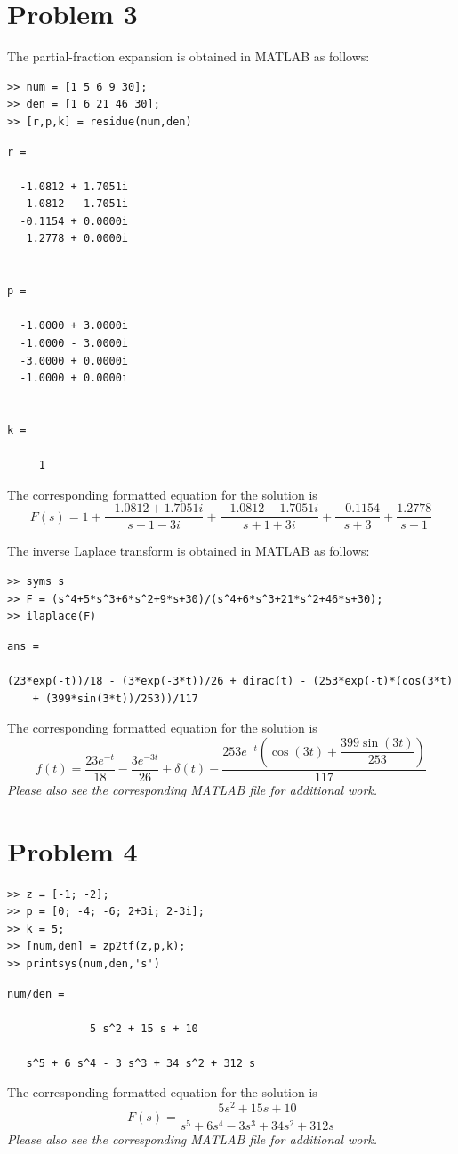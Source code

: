 \documentclass[letterpaper,10pt]{article}
\begin{document}
\section*{Problem 3}
The partial-fraction expansion is obtained in MATLAB as follows:
\begin{verbatim}
>> num = [1 5 6 9 30];
>> den = [1 6 21 46 30];
>> [r,p,k] = residue(num,den)
\end{verbatim}
\color{lightgray} \begin{verbatim}
r =

  -1.0812 + 1.7051i
  -1.0812 - 1.7051i
  -0.1154 + 0.0000i
   1.2778 + 0.0000i


p =

  -1.0000 + 3.0000i
  -1.0000 - 3.0000i
  -3.0000 + 0.0000i
  -1.0000 + 0.0000i


k =

     1
\end{verbatim} \color{black}
The corresponding formatted equation for the solution is
\begin{equation}
	F(s) = 1 + \frac{-1.0812+1.7051i}{s+1-3i} + \frac{-1.0812-1.7051i}{s+1+3i} + \frac{-0.1154}{s+3} + \frac{1.2778}{s+1}
\end{equation}

The inverse Laplace transform is obtained in MATLAB as follows:
\begin{verbatim}
>> syms s
>> F = (s^4+5*s^3+6*s^2+9*s+30)/(s^4+6*s^3+21*s^2+46*s+30);
>> ilaplace(F)
\end{verbatim}
\color{lightgray} \begin{verbatim}
ans =
 
(23*exp(-t))/18 - (3*exp(-3*t))/26 + dirac(t) - (253*exp(-t)*(cos(3*t) 
	+ (399*sin(3*t))/253))/117
\end{verbatim} \color{black}
The corresponding formatted equation for the solution is
\begin{equation}
	f(t) = \frac{23e^{-t}}{18} 
	- \frac{3e^{-3t}}{26} 
	+ \delta(t) 
	- \dfrac{253e^{-t}\left(\cos(3t) + \dfrac{399\sin(3t)}{253}\right)}{117}
\end{equation}
\emph{Please also see the corresponding MATLAB file for additional work.}

\section*{Problem 4}
\begin{verbatim}
>> z = [-1; -2];
>> p = [0; -4; -6; 2+3i; 2-3i];
>> k = 5;
>> [num,den] = zp2tf(z,p,k);
>> printsys(num,den,'s')
\end{verbatim}
\color{lightgray} \begin{verbatim} 
num/den = 
 
             5 s^2 + 15 s + 10
   ------------------------------------
   s^5 + 6 s^4 - 3 s^3 + 34 s^2 + 312 s
\end{verbatim} \color{black}
The corresponding formatted equation for the solution is
\begin{equation}
	F(s)=\dfrac{5 s^2 + 15 s + 10}{ s^5 + 6 s^4 - 3 s^3 + 34 s^2 + 312 s}
\end{equation}
\emph{Please also see the corresponding MATLAB file for additional work.}
\end{document}
